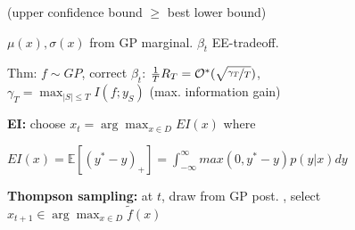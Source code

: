 (upper confidence bound $\geq$ best lower bound)

$\mu(x), \sigma(x)$ from GP marginal. $\beta_t$ EE-tradeoff.

Thm: $f \sim GP$, correct $\beta_t$: $\frac{1}{T}R_T = \mathcal{O}^*(\sqrt{\nicefrac{\gamma_T}{T}})$, \\
$\gamma_T = \max_{|S| \leq T} I(f; y_S)$ (max. information gain)


\textbf{EI:} \; choose $x_t = \arg\max_{x \in D} EI(x)$ where

$EI(x) = \mathbb{E}[(y^* - y)_+] = \int_{-\infty}^{\infty} max(0, y^* - y) p(y | x) dy$

\textbf{Thompson sampling:} \; at $t$, draw from GP post. , select $x_{t+1} \in \arg\max_{x \in D} \tilde{f}(x)$